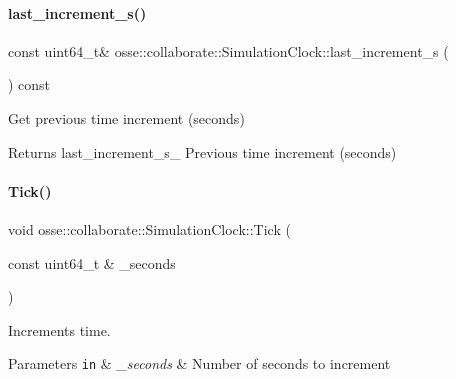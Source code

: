 \paragraph{\texorpdfstring{last\+\_\+increment\+\_\+s()}{last\_increment\_s()}}
{\footnotesize\ttfamily const uint64\+\_\+t\& osse\+::collaborate\+::\+Simulation\+Clock\+::last\+\_\+increment\+\_\+s (\begin{DoxyParamCaption}{ }\end{DoxyParamCaption}) const\hspace{0.3cm}{\ttfamily [inline]}}



Get previous time increment (seconds) 

\begin{DoxyReturn}{Returns}
last\+\_\+increment\+\_\+s\+\_\+ Previous time increment (seconds) 
\end{DoxyReturn}
\mbox{\label{classosse_1_1collaborate_1_1_simulation_clock_aabf56af06948df891086681c1651cbfe}} 
\paragraph{\texorpdfstring{Tick()}{Tick()}}
{\footnotesize\ttfamily void osse\+::collaborate\+::\+Simulation\+Clock\+::\+Tick (\begin{DoxyParamCaption}\item[{const uint64\+\_\+t \&}]{\+\_\+seconds }\end{DoxyParamCaption})}



Increments time. 


\begin{DoxyParams}[1]{Parameters}
\mbox{\tt in}  & {\em \+\_\+seconds} & Number of seconds to increment \\
\hline
\end{DoxyParams}
\mbox{\label{classosse_1_1collaborate_1_1_simulation_clock_a0791fb7aeb5fb252f8a57e572dab823a}} 
